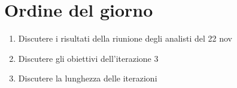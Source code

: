 \section{Ordine del giorno}

\begin{enumerate}
    \item Discutere i risultati della riunione degli analisti del 22 nov
    \item Discutere gli obiettivi dell'iterazione 3
    \item Discutere la lunghezza delle iterazioni
\end{enumerate}